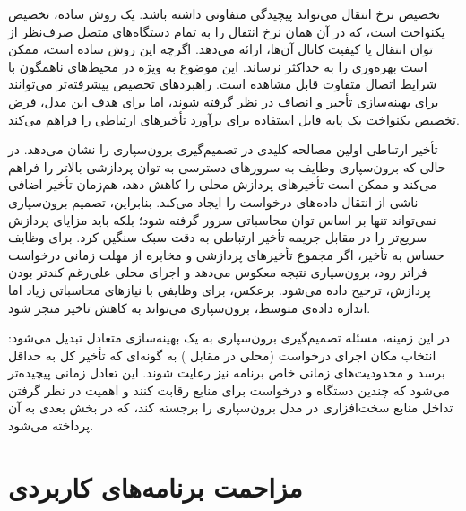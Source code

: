 تخصیص نرخ انتقال می‌تواند پیچیدگی متفاوتی داشته باشد. یک روش ساده، تخصیص یکنواخت است، که در آن  همان نرخ انتقال را به تمام دستگاه‌های متصل صرف‌نظر از توان انتقال یا کیفیت کانال آن‌ها، ارائه می‌دهد. اگرچه این روش ساده است، ممکن است بهره‌وری را به حداکثر نرساند. این موضوع به ویژه در محیط‌های ناهمگون با شرایط اتصال متفاوت قابل مشاهده است. راهبردهای تخصیص پیشرفته‌تر می‌توانند برای بهینه‌سازی تأخیر و انصاف در نظر گرفته شوند، اما برای هدف این مدل، فرض تخصیص یکنواخت یک پایه قابل استفاده برای برآورد تأخیرهای ارتباطی را فراهم می‌کند.

تأخیر ارتباطی اولین مصالحه کلیدی در تصمیم‌گیری برون‌سپاری را نشان می‌دهد. در حالی که برون‌سپاری وظایف به سرورهای  دسترسی به توان پردازشی بالاتر را فراهم می‌کند و ممکن است تأخیرهای پردازش محلی را کاهش دهد، هم‌زمان تأخیر اضافی ناشی از انتقال ‌داده‌های درخواست را ایجاد می‌کند. بنابراین، تصمیم برون‌سپاری نمی‌تواند تنها بر اساس توان محاسباتی سرور  گرفته شود؛ بلکه باید مزایای پردازش سریع‌تر را در مقابل جریمه‌ تأخیر ارتباطی به دقت سبک سنگین کرد. برای وظایف حساس به تأخیر، اگر مجموع تأخیرهای پردازشی و مخابره از مهلت زمانی درخواست فراتر رود، برون‌سپاری نتیجه معکوس می‌دهد و اجرای محلی علی‌رغم کندتر بودن پردازش، ترجیح داده می‌شود. برعکس، برای وظایفی با نیازهای محاسباتی زیاد اما اندازه داده‌ی متوسط، برون‌سپاری می‌تواند به کاهش تاخیر منجر شود.

در این زمینه، مسئله تصمیم‌گیری برون‌سپاری به یک بهینه‌سازی متعادل تبدیل می‌شود: انتخاب مکان اجرای درخواست (محلی در مقابل ) به گونه‌ای که تأخیر کل به حداقل برسد و محدودیت‌های زمانی خاص برنامه نیز رعایت شوند. این تعادل زمانی پیچیده‌تر می‌شود که چندین دستگاه و درخواست برای منابع  رقابت کنند و اهمیت در نظر گرفتن تداخل منابع سخت‌افزاری در مدل برون‌سپاری را برجسته کند، که در بخش‌ بعدی به آن پرداخته می‌شود.

\section{مزاحمت برنامه‌های کاربردی}
\label{subsec:interference_model}

